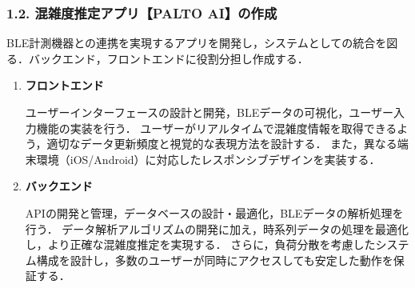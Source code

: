 \subsubsection*{1.2. 混雑度推定アプリ【PALTO AI】の作成}
BLE計測機器との連携を実現するアプリを開発し，システムとしての統合を図る．バックエンド，フロントエンドに役割分担し作成する．
\begin{enumerate}
    \item {\bfseries フロントエンド}
    
    ユーザーインターフェースの設計と開発，BLEデータの可視化，ユーザー入力機能の実装を行う．
	ユーザーがリアルタイムで混雑度情報を取得できるよう，適切なデータ更新頻度と視覚的な表現方法を設計する．
	また，異なる端末環境（iOS/Android）に対応したレスポンシブデザインを実装する．
    
    \item {\bfseries バックエンド}
    
    APIの開発と管理，データベースの設計・最適化，BLEデータの解析処理を行う．
	データ解析アルゴリズムの開発に加え，時系列データの処理を最適化し，より正確な混雑度推定を実現する．
	さらに，負荷分散を考慮したシステム構成を設計し，多数のユーザーが同時にアクセスしても安定した動作を保証する．
\end{enumerate}

